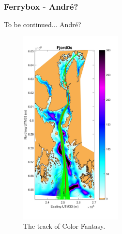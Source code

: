 \documentclass[12pt,a4paper,english]{article}
\begin{document}
\subsubsection{Ferrybox - Andr\'{e}?}
To be continued... Andr\'{e}?

\begin{figure}[ht]
\centerline{
\includegraphics*[trim=1cm 0cm 1cm 0cm,clip=true,height=10cm]{Figurer/FjordOs_with_FA_track}}
\caption{\small
The track of Color Fantasy.}
\label{fig:Ferrybox_track}
\end{figure}
\end{document}
